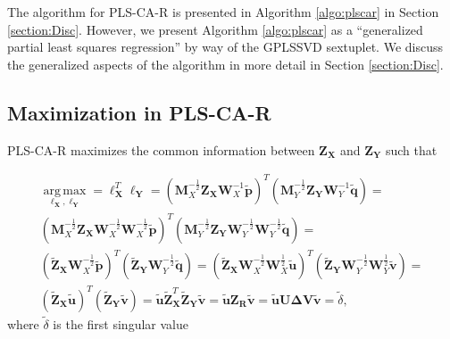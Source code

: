 \documentclass[12pt]{article}
\begin{document}
The algorithm for PLS-CA-R is presented in Algorithm \ref{algo:plscar}
in Section \ref{section:Disc}. However, we present Algorithm
\ref{algo:plscar} as a ``generalized partial least squares regression''
by way of the GPLSSVD sextuplet. We discuss the generalized aspects of
the algorithm in more detail in Section \ref{section:Disc}.

\hypertarget{maximization-in-pls-ca-r}{%
\subsection{Maximization in PLS-CA-R}\label{maximization-in-pls-ca-r}}

PLS-CA-R maximizes the common information between
\({\mathbf Z}_{\mathbf X}\) and \({\mathbf Z}_{\mathbf Y}\) such that

\begin{equation}
\begin{aligned}
\underset{{\boldsymbol \ell}_{\mathbf X},{\boldsymbol \ell}_{\mathbf Y}}{\operatorname{arg\,max}} = {\boldsymbol \ell}_{\mathbf X}^{T}{\boldsymbol \ell}_{\mathbf Y} = 
({\mathbf M}_{X}^{-\frac{1}{2}}{\mathbf Z}_{\mathbf X}{\mathbf W}_{X}^{-1}\widetilde{\mathbf p})^{T}({\mathbf M}_{Y}^{-\frac{1}{2}}{\mathbf Z}_{\mathbf Y}{\mathbf W}_{Y}^{-1}\widetilde{\mathbf q}) = \\
({\mathbf M}_{X}^{-\frac{1}{2}}{\mathbf Z}_{\mathbf X}{\mathbf W}_{X}^{-\frac{1}{2}}{\mathbf W}_{X}^{-\frac{1}{2}}\widetilde{\mathbf p})^{T}({\mathbf M}_{Y}^{-\frac{1}{2}}{\mathbf Z}_{\mathbf Y}{\mathbf W}_{Y}^{-\frac{1}{2}}{\mathbf W}_{Y}^{-\frac{1}{2}}\widetilde{\mathbf q}) = \\
( \widetilde{\mathbf Z}_{\mathbf X} {\mathbf W}_{X}^{-\frac{1}{2}}\widetilde{\mathbf p})^{T}(\widetilde{\mathbf Z}_{\mathbf Y}{\mathbf W}_{Y}^{-\frac{1}{2}}\widetilde{\mathbf q}) = 
( \widetilde{\mathbf Z}_{\mathbf X} {\mathbf W}_{X}^{-\frac{1}{2}}{\mathbf W}_{X}^{\frac{1}{2}}\widetilde{\mathbf u})^{T}(\widetilde{\mathbf Z}_{\mathbf Y}{\mathbf W}_{Y}^{-\frac{1}{2}}{\mathbf W}_{Y}^{\frac{1}{2}}\widetilde{\mathbf v}) = \\ 
(\widetilde{\mathbf Z}_{\mathbf X}\widetilde{\mathbf u})^{T}(\widetilde{\mathbf Z}_{\mathbf Y}\widetilde{\mathbf v}) = \widetilde{\mathbf u}\widetilde{\mathbf Z}_{\mathbf X}^{T}\widetilde{\mathbf Z}_{\mathbf Y}\widetilde{\mathbf v} = \widetilde{\mathbf u}{\mathbf Z}_{\mathbf R}\widetilde{\mathbf v} = \widetilde{\mathbf u}{\mathbf U}{\boldsymbol \Delta}{\mathbf V}\widetilde{\mathbf v}  = \widetilde\delta,
\end{aligned}
\end{equation} where \(\widetilde\delta\) is the first singular value
\end{document}
